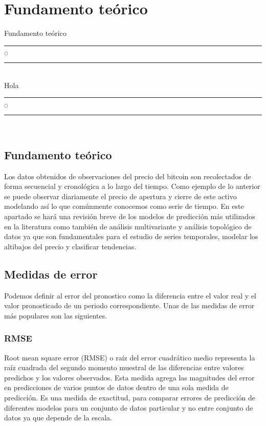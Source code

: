 \chapter[Fundamento teórico]{Fundamento teórico}{Fundamento teórico}\label{Fundamento}

\noindent
\rule{0.49\textwidth}{0.75pt} $_{\bigcirc}$ \rule{0.49\textwidth}{0.75pt}\\


Hola\\


\noindent
\rule{0.49\textwidth}{0.75pt} $_{\bigcirc}$ \rule{0.49\textwidth}{0.75pt}\\
\clearpage

\section{Fundamento teórico}

Los datos obtenidos de observaciones del precio del bitcoin son recolectados de forma secuencial y cronológica a lo largo del tiempo. Como ejemplo de lo anterior se puede observar diariamente el precio de apertura y cierre de este activo modelando así lo que comúnmente conocemos como serie de tiempo. En este apartado se hará una revisión breve de los modelos de predicción más utilizados en la literatura como también de análisis multivariante y análisis topológico de datos ya que son fundamentales para el estudio de series temporales, modelar los altibajos del precio y clasificar tendencias.

\section{Medidas de error}
Podemos definir al error del pronostico como la diferencia entre el valor real y el valor pronosticado de un periodo correspondiente. Unas de las medidas de error más populares son las siguientes.

\subsection{RMSE}

Root mean square error (RMSE) o raíz del error cuadrático medio representa la raíz cuadrada del segundo momento muestral de las diferencias entre valores predichos y los valores observados. Esta medida agrega las magnitudes del error en predicciones de varios puntos de datos dentro de una sola medida de predicción.
Es una medida de exactitud, para comparar errores de predicción de diferentes modelos para un conjunto de datos particular y no entre conjunto de datos ya que depende de la escala.

